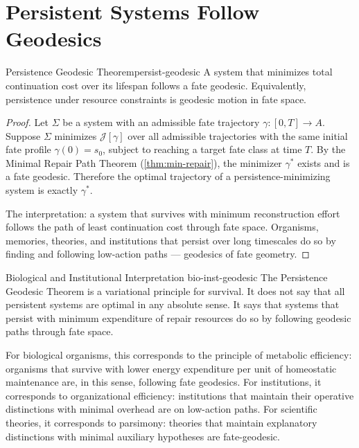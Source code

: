 \documentclass[12pt,twoside,openright]{book}
\newcommand{\admRegion}{A}
\providecommand{\admRegion}{A}
\providecommand{\contAction}{\mathcal{J}}
\providecommand{\fateTraj}{\gamma}
\providecommand{\fateGeo}{\fateTraj^{*}}
\begin{document}
\section{Persistent Systems Follow Geodesics}

\begin{theorem}{Persistence Geodesic Theorem}{persist-geodesic}
A system that minimizes total continuation cost over its
lifespan follows a fate geodesic. Equivalently, persistence
under resource constraints is geodesic motion in fate space.
\begin{proof}
Let $\Sigma$ be a system with an admissible fate trajectory
$\fateTraj:[0,T]\to\admRegion$. Suppose $\Sigma$ minimizes
$\contAction[\fateTraj]$ over all admissible trajectories with
the same initial fate profile $\fateTraj(0)=s_0$, subject to
reaching a target fate class at time $T$. By the Minimal Repair
Path Theorem (\cref{thm:min-repair}), the minimizer $\fateGeo$
exists and is a fate geodesic. Therefore the optimal trajectory
of a persistence-minimizing system is exactly $\fateGeo$.

The interpretation: a system that survives with minimum
reconstruction effort follows the path of least continuation
cost through fate space. Organisms, memories, theories, and
institutions that persist over long timescales do so by
finding and following low-action paths --- geodesics of fate
geometry.
\end{proof}
\end{theorem}

\begin{remark}{Biological and Institutional Interpretation}%
  {bio-inst-geodesic}
The Persistence Geodesic Theorem is a variational principle
for survival. It does not say that all persistent systems are
optimal in any absolute sense. It says that systems that
persist with minimum expenditure of repair resources do so by
following geodesic paths through fate space.

For biological organisms, this corresponds to the principle of
metabolic efficiency: organisms that survive with lower energy
expenditure per unit of homeostatic maintenance are, in this
sense, following fate geodesics. For institutions, it
corresponds to organizational efficiency: institutions that
maintain their operative distinctions with minimal overhead are
on low-action paths. For scientific theories, it corresponds to
parsimony: theories that maintain explanatory distinctions with
minimal auxiliary hypotheses are fate-geodesic.
\end{remark}
\end{document}
